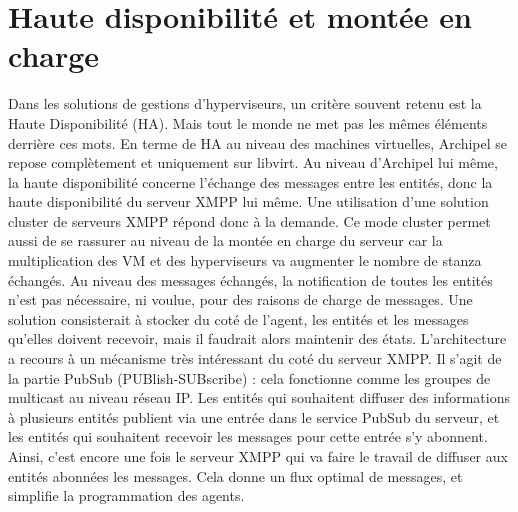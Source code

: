 \section{Haute disponibilité et montée en charge}
Dans les solutions de gestions d'hyperviseurs, un critère souvent retenu est la Haute Disponibilité (HA). Mais tout le monde ne met pas les mêmes éléments derrière ces mots. En terme de HA au niveau des machines virtuelles, Archipel se repose complètement et uniquement sur libvirt. Au niveau d'Archipel lui même, la haute disponibilité concerne l'échange des messages entre les entités, donc la haute disponibilité du serveur XMPP lui même. Une utilisation d'une solution cluster de serveurs XMPP répond donc à la demande. Ce mode cluster permet aussi de se rassurer au niveau de la montée en charge du serveur car la multiplication des VM et des hyperviseurs va augmenter le nombre de stanza échangés.
\newline
Au niveau des messages échangés, la notification de toutes les entités n'est pas nécessaire, ni voulue, pour des raisons de charge de messages. Une solution consisterait à stocker du coté de l'agent, les entités et les messages qu'elles doivent recevoir, mais il faudrait alors maintenir des états. L'architecture a recours à un mécanisme très intéressant du coté du serveur XMPP. Il s'agit de la partie PubSub (PUBlish-SUBscribe) : cela fonctionne comme les groupes de multicast au niveau réseau IP. Les entités qui souhaitent diffuser des informations à plusieurs entités publient via une entrée dans le service PubSub du serveur, et les entités qui souhaitent recevoir les messages pour cette entrée s'y abonnent. Ainsi, c'est encore une fois le serveur XMPP qui va faire le travail de diffuser aux entités abonnées les messages. Cela donne un flux optimal de messages, et simplifie la programmation des agents.
\newline

